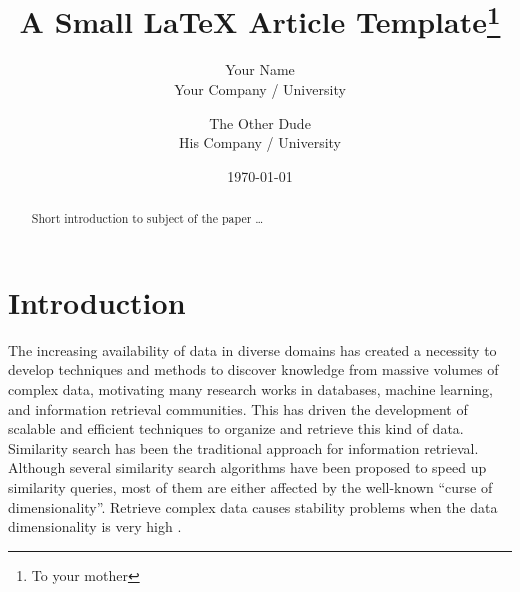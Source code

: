 \documentclass{article}
\title{A Small \LaTeX{} Article Template\thanks{To your mother}}
\author{Your Name  \\
	Your Company / University  \\
	\and 
	The Other Dude \\
	His Company / University \\
	}
\date{\today}
\begin{document}
\maketitle


\begin{abstract}
Short introduction to subject of the paper \ldots 
\end{abstract}
 
 
 
 

\section{Introduction}\label{sec:intro}

The increasing availability of data in diverse domains has created a necessity to develop techniques and methods to discover knowledge from massive volumes of complex data, motivating many research works in databases, machine learning, and information retrieval communities.  This has driven the development of scalable and efficient techniques to organize and retrieve this kind of data. Similarity search has been the traditional approach for information retrieval.  Although several similarity search algorithms have been proposed to speed up similarity queries, most of them are either affected by the well-known ``curse of dimensionality''.  Retrieve  complex data causes   stability problems  when the data dimensionality is very high \cite{aleman_high_dimensional}.  %


\end{document}
